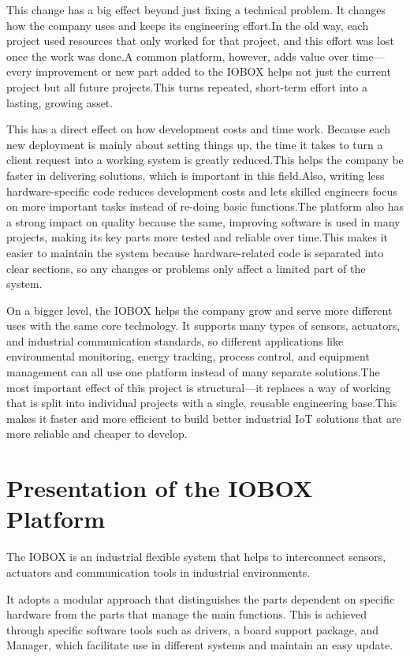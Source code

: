 This change has a big effect beyond just fixing a technical problem.
It changes how the company uses and keeps its engineering effort.In the old way, each project used resources that only worked for that project, and this effort was lost once the work was done.A common platform, however, adds value over time—every improvement or new part added to the IOBOX helps not just the current project but all future projects.This turns repeated, short-term effort into a lasting, growing asset.

This has a direct effect on how development costs and time work.
Because each new deployment is mainly about setting things up, the time it takes to turn a client request into a working system is greatly reduced.This helps the company be faster in delivering solutions, which is important in this field.Also, writing less hardware-specific code reduces development costs and lets skilled engineers focus on more important tasks instead of re-doing basic functions.The platform also has a strong impact on quality because the same, improving software is used in many projects, making its key parts more tested and reliable over time.This makes it easier to maintain the system because hardware-related code is separated into clear sections, so any changes or problems only affect a limited part of the system.

On a bigger level, the IOBOX helps the company grow and serve more different uses with the same core technology.
It supports many types of sensors, actuators, and industrial communication standards, so different applications like environmental monitoring, energy tracking, process control, and equipment management can all use one platform instead of many separate solutions.The most important effect of this project is structural—it replaces a way of working that is split into individual projects with a single, reusable engineering base.This makes it faster and more efficient to build better industrial IoT solutions that are more reliable and cheaper to develop.
\section{Presentation of the IOBOX Platform}

The IOBOX is an industrial flexible system that helps to interconnect sensors, actuators and communication tools in industrial environments.

It adopts a modular approach that distinguishes the parts dependent on specific hardware from the parts that manage the main functions.
This is achieved through specific software tools such as drivers, a board support package, and Manager, which facilitate use in different systems and maintain an easy update.

